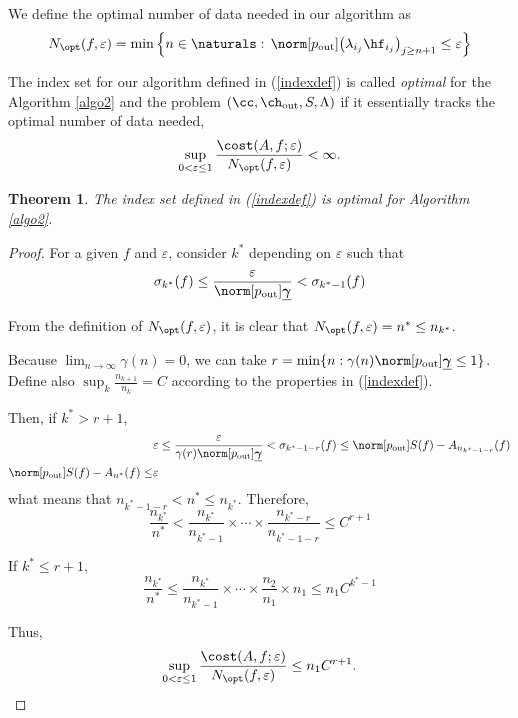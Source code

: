 \documentclass[final]{elsarticle}
\newcommand{\chout}{\ch_{\text{\rm{out}}}}
\newcommand{\pout}{p_{\text{\rm{out}}}}
\newcommand{\bgamma}{\underline{\boldsymbol\gamma}}
\newtheorem{theorem}{Theorem}
\theoremstyle{definition}
\theoremstyle{remark}
\begin{document}
We define the optimal number of data needed in our algorithm as
\begin{equation*}
N_{\opt}(f,\varepsilon)=\min\left\{n\in\naturals:\,\norm[\pout]{\left(\lambda_{i_j} \hf_{i_j} \right)_{j\ge n+1}} \le \varepsilon \right\}
\end{equation*}

The index set for our algorithm defined in (\ref{indexdef}) is called \emph{optimal} for the Algorithm \ref{algo2} and the problem $(\cc,\chout,S,\Lambda)$ if it essentially tracks the optimal number of data needed,
\begin{equation} \label{nearoptdef}
\sup_{0 < \varepsilon \le 1} \frac{\cost(A,f;\varepsilon)} {N_{\opt}(f,\varepsilon)} <\infty.
\end{equation}

\begin{theorem}\label{nopt}
The index set defined in (\ref{indexdef}) is optimal for Algorithm \ref{algo2}.
\end{theorem}
\begin{proof}
For a given $f$ and $\varepsilon$, consider $k^*$ depending on $\varepsilon$ such that
\begin{equation*}
\sigma_{k^*}(f) \le \frac{\varepsilon}{\norm[\pout]{\bgamma}} < \sigma_{k^*-1}(f)
\end{equation*}

From the definition of $N_{\opt}(f,\varepsilon)$, it is clear that $N_{\opt}(f,\varepsilon)=n^*\le n_{k^*}$.

Because $\lim_{n\rightarrow\infty}\gamma(n)=0$, we can take $r=\min\{n: \gamma(n)\norm[\pout]{\bgamma} \le 1\}$. Define also $\sup_k\frac{n_{k+1}}{n_k}=C$ according to the properties in (\ref{indexdef}).

Then, if $k^*>r+1$,
\begin{align*}
& \varepsilon \le \frac{\varepsilon}{\gamma(r)\norm[\pout]{\bgamma}} < \sigma_{k^*-1-r}(f) \le \norm[\pout]{S(f)-A_{n_{k^*-1-r}}(f)} \\
\norm[\pout]{S(f)-A_{n^*}(f)} \le & \varepsilon
\end{align*}
what means that $n_{k^*-1-r} < n^* \le n_{k^*}$. Therefore,
\begin{equation*}
\frac{n_{k^*}}{n^*} < \frac{n_{k^*}}{n_{k^*-1}}\times\cdots\times\frac{n_{k^*-r}}{n_{k^*-1-r}} \le C^{r+1}
\end{equation*}

If $k^* \le r+1$,
\begin{equation*}
\frac{n_{k^*}}{n^*} \le \frac{n_{k^*}}{n_{k^*-1}}\times\cdots\times\frac{n_{2}}{n_{1}}\times n_{1} \le n_{1}C^{k^*-1}
\end{equation*}

Thus,
\begin{equation*}
\sup_{0 < \varepsilon \le 1} \frac{\cost(A,f;\varepsilon)} {N_{\opt}(f,\varepsilon)} \le n_1C^{r+1}.
\end{equation*}
\end{proof}
\end{document}
